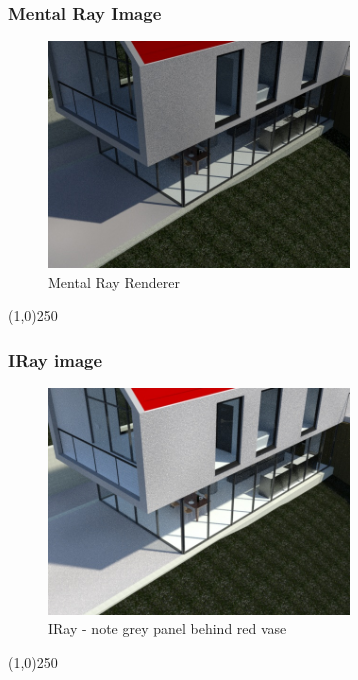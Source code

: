 \begin{frame}
\frametitle{Mental Ray Image}
\begin{figure}
	\centering
		\includegraphics[height=6cm]{img/RenderEngine/Revit3DSMentalRay.jpg}
	\caption{Mental Ray Renderer}
	\label{fig:MentalRay}
\end{figure}
\end{frame}
\begin{center}\line(1,0){250}\end{center}



\begin{frame}
\frametitle{IRay image}
\begin{figure}
	\centering
		\includegraphics[height=6cm]{img/RenderEngine/Revit3DSIRay.jpg}
	\caption{IRay - note grey panel behind red vase}
	\label{fig:IRay}
\end{figure}
\end{frame}
\begin{center}\line(1,0){250}\end{center}


